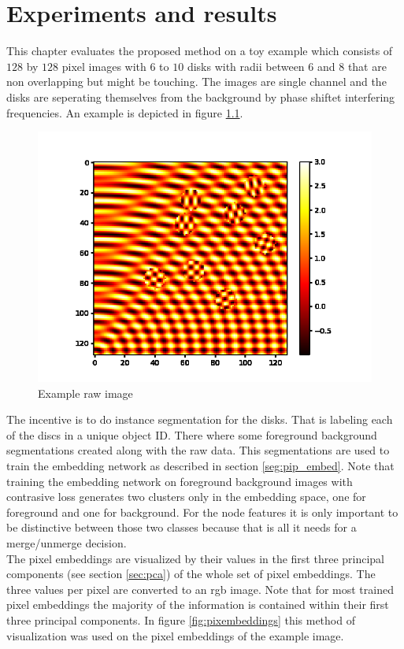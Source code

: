 \chapter{Experiments and results}\label{chap:exp_res}
This chapter evaluates the proposed method on a toy example which consists of $128$ by $128$ pixel images with $6$ to $10$ disks with radii between $6$ and $8$ that are non overlapping but might be touching. The images are single channel and the disks are seperating themselves from the background by phase shiftet interfering frequencies. An example is depicted in figure \ref{fig:exmpl}.

\begin{figure}[ht!]
	\centering
	\includegraphics[width=.5\textwidth]{figures/plots/raw.png}
	\caption{Example raw image}
	\label{fig:exmpl}
\end{figure}

The incentive is to do instance segmentation for the disks. That is labeling each of the discs in a unique object ID. There where some foreground background segmentations created along with the raw data. This segmentations are used to train the embedding network as described in section \ref{seg:pip_embed}. Note that training the embedding network on foreground background images with contrasive loss generates two clusters only in the embedding space, one for foreground and one for background. For the node features it is only important to be distinctive between those two classes because that is all it needs for a merge/unmerge decision.\\
The pixel embeddings are visualized by their values in the first three principal components (see section \ref{sec:pca}) of the whole set of pixel embeddings. The three values per pixel are converted to an rgb image. Note that for most trained pixel embeddings the majority of the information is contained within their first three principal components. In figure \ref{fig:pixembeddings} this method of visualization was used on the pixel embeddings of the example image.\\


